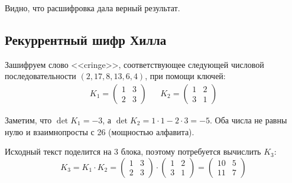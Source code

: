 \documentclass[a4paper]{article}
\begin{document}
  Видно, что расшифровка дала верный результат.

  \subsection{Рекуррентный шифр Хилла}

  Зашифруем слово <<cringe>>, соответствующее следующей числовой последовательности
  $(2, 17, 8, 13, 6, 4)$, при помощи ключей:
  \begin{align}
    K_1 = \begin{pmatrix}
        1 & 3 \\ 2 & 3
    \end{pmatrix} &&  K_2 = \begin{pmatrix}
        1 & 2 \\ 3 & 1
    \end{pmatrix}
  \end{align}

  Заметим, что $\det{K_1} = -3$, а $\det{K_2} = 1\cdot 1 - 2\cdot 3 = -5$. Оба числа не равны
  нулю и взаимнопросты с 26 (мощностью алфавита).

  Исходный текст поделится на 3 блока, поэтому потребуется вычислить $K_3$:
  \begin{equation}
    K_3 = K_1\cdot K_2 = \begin{pmatrix}
        1 & 3 \\ 2 & 3
    \end{pmatrix} \cdot \begin{pmatrix}
        1 & 2 \\ 3 & 1
    \end{pmatrix} = \begin{pmatrix}
        10 & 5 \\ 11 & 7
    \end{pmatrix}
  \end{equation}
\end{document}
